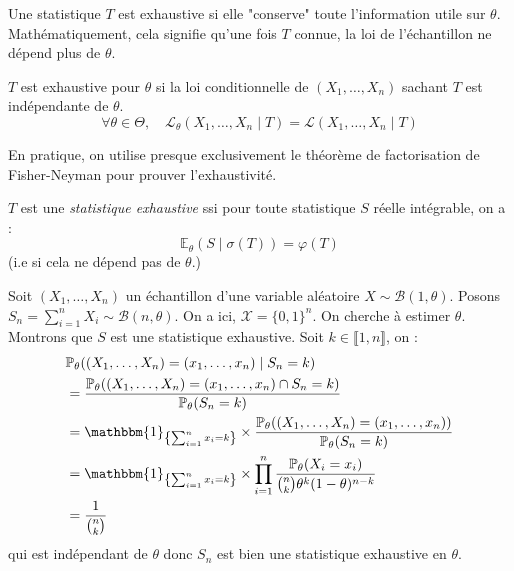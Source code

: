 Une statistique $T$ est exhaustive si elle "conserve" toute l'information utile sur $\theta$. Mathématiquement, 
cela signifie qu'une fois $T$ connue, la loi de l'échantillon ne dépend plus de $\theta$.

\begin{definition}
    $T$ est exhaustive pour $\theta$ si la loi conditionnelle de $(X_1, \dots, X_n)$ sachant $T$ est indépendante de $\theta$. 
    $$ \forall \theta \in \Theta, \quad \mathcal{L}_\theta(X_1, \dots, X_n \mid T) = \mathcal{L}(X_1, \dots, X_n \mid T) $$
\end{definition}

\begin{remark}
    En pratique, on utilise presque exclusivement le {théorème de factorisation de Fisher-Neyman} pour 
    prouver l'exhaustivité.
\end{remark}

\begin{proposition}
    $T$ est une \emph{statistique exhaustive} ssi pour toute statistique $S$ réelle intégrable, on a : 
        \begin{equation}
            \mathbb{E}_\theta(S \mid \sigma(T)) = \varphi( T)
        \end{equation}
    (i.e si cela ne dépend pas de $ \theta$.)
\end{proposition}

\begin{example}
    Soit $(X_1, \dots, X_n)$ un échantillon d'une variable aléatoire $ X \sim \mathcal{B}(1, \theta)$. Posons 
    $S_n = \sum_{i=1}^{n} X_i \sim \mathcal{B}(n, \theta)$. On a ici, $ \mathcal{X} = \{0, 1\}^n$. 
    On cherche à estimer $ \theta$. Montrons que $S$ est une statistique exhaustive. 
    Soit $k \in \llbracket 1, n \rrbracket$, on : 
    \begin{align*}
        & \myP_\theta ((X_1, \dots, X_n) = (x_1, \dots, x_n) \mid S_n = k) \\ 
        &= \frac{ \myP_\theta( (X_1, \dots, X_n) = (x_1, \dots, x_n) \cap S_n = k)}{ \myP_\theta(S_n = k)} \\ 
        &= \mathbbm{1}_{\left\{\sum_{i=1}^{n} x_i = k\right\}} \times  \frac{ \myP_\theta( (X_1, \dots, X_n) = (x_1, \dots, x_n))}{ \myP_\theta(S_n = k)} \\ 
        &= \mathbbm{1}_{\left\{\sum_{i=1}^{n} x_i = k\right\}} \times \prod_{i=1}^{n} \frac{ \myP_\theta(X_i = x_i)}{ \binom{n}{k} \theta^k (1 - \theta)^{n - k}} \\ 
        &= \frac{1}{\binom{n}{k}}
    \end{align*}
    qui est indépendant de $ \theta$ donc $S_n$ est bien une statistique exhaustive en $ \theta$. 
\end{example}


